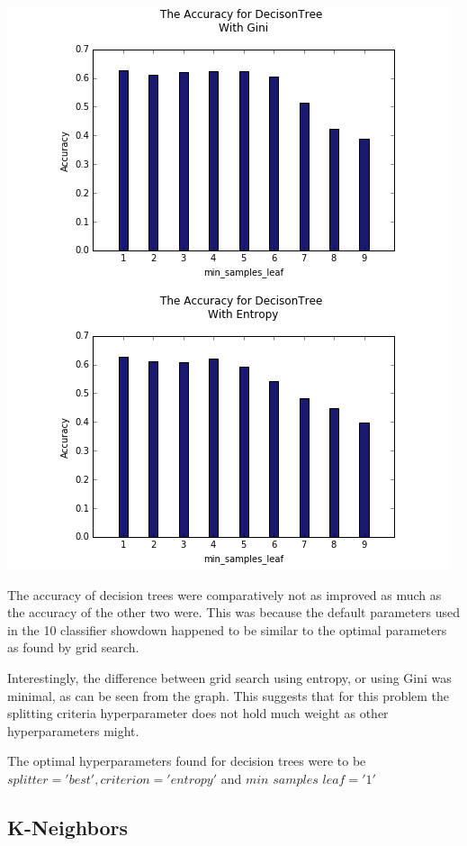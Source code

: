 \documentclass{article}
\begin{document}
\includegraphics[scale=0.6]{d_trees_crop}

The accuracy of decision trees were comparatively not as improved as much as the accuracy of the other two were. This was because the default parameters used in the 10 classifier showdown \cite{showdown} happened to be similar to the optimal parameters as found by grid search. 

Interestingly, the difference between grid search using entropy, or using Gini was minimal, as can be seen from the graph. This suggests that for this problem the splitting criteria hyperparameter does not hold much weight as other hyperparameters might. 

The optimal hyperparameters found for decision trees were to be $splitter = 'best', criterion = 'entropy'$ and $min$ \textunderscore $samples$ \textunderscore $leaf = '1'$

\subsection{K-Neighbors}
\end{document}
